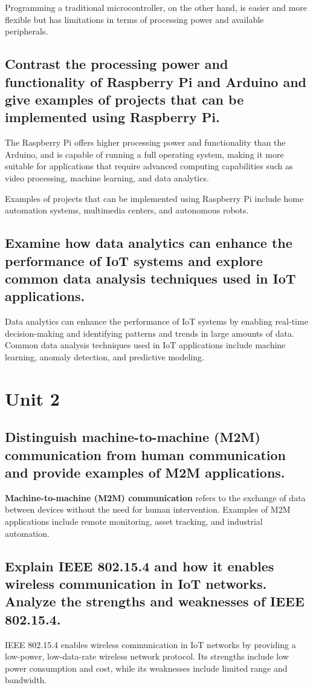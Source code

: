 \documentclass[12pt, a4paper, oneside]{article}
\begin{document}
Programming a traditional microcontroller, on the other hand, is easier and more flexible but has limitations in terms of processing power and available peripherals.

\subsection{Contrast the processing power and functionality of Raspberry Pi and Arduino and give examples of projects that can be implemented using Raspberry Pi.}
The Raspberry Pi offers higher processing power and functionality than the Arduino, and is capable of running a full operating system, making it more suitable for applications that require advanced computing capabilities such as video processing, machine learning, and data analytics.

Examples of projects that can be implemented using Raspberry Pi include home automation systems, multimedia centers, and autonomous robots.

\subsection{Examine how data analytics can enhance the performance of IoT systems and explore common data analysis techniques used in IoT applications.}
Data analytics can enhance the performance of IoT systems by enabling real-time decision-making and identifying patterns and trends in large amounts of data. Common data analysis techniques used in IoT applications include machine learning, anomaly detection, and predictive modeling.

\section{Unit 2}

\subsection{Distinguish machine-to-machine (M2M) communication from human communication and provide examples of M2M applications.}
\textbf{Machine-to-machine (M2M) communication} refers to the exchange of data between devices without the need for human intervention. Examples of M2M applications include remote monitoring, asset tracking, and industrial automation.

\subsection{Explain IEEE 802.15.4 and how it enables wireless communication in IoT networks. Analyze the strengths and weaknesses of IEEE 802.15.4.}
IEEE 802.15.4 enables wireless communication in IoT networks by providing a low-power, low-data-rate wireless network protocol. Its strengths include low power consumption and cost, while its weaknesses include limited range and bandwidth.
\end{document}
